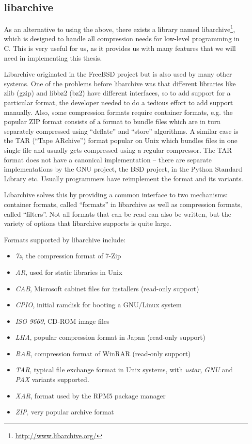 \documentclass[parskip=half]{scrreprt}
\begin{document}
\subsection{libarchive}
\label{sec:libarchive}

As an alternative to using the above, there exists a library named
libarchive\footnote{\url{http://www.libarchive.org/}}, which is designed to
handle all compression needs for low-level programming in C. This is very
useful for us, as it provides us with many features that we will need in
implementing this thesis.

Libarchive originated in the FreeBSD project but is also used by many other
systems. One of the problems before libarchive was that different libraries
like zlib (gzip) and libbz2 (bz2) have different interfaces, so to add support
for a particular format, the developer needed to do a tedious effort to add
support manually. Also, some compression formats require container formats,
e.g. the popular ZIP format consists of a format to bundle files which are in
turn separately compressed using \enquote{deflate} and \enquote{store}
algorithms. A similar case is the TAR (\enquote{Tape ARchive}) format popular
on Unix which bundles files in one single file and usually gets compressed
using a regular compressor. The TAR format does not have a canonical
implementation -- there are separate implementations by the GNU project, the
BSD project, in the Python Standard Library etc. Usually programmers have
reimplement the format and its variants.

Libarchive solves this by providing a common interface to two mechanisms:
container formats, called \enquote{formats} in libarchive as well as
compression formats, called \enquote{filters}. Not all formats that can be read
can also be written, but the variety of options that libarchive supports is
quite large.

Formats supported by libarchive include:

\begin{itemize}
  \item \emph{7z}, the compression format of 7-Zip
  \item \emph{AR}, used for static libraries in Unix
  \item \emph{CAB}, Microsoft cabinet files for installers (read-only support)
  \item \emph{CPIO}, initial ramdisk for booting a GNU/Linux system
  \item \emph{ISO 9660}, CD-ROM image files
  \item \emph{LHA}, popular compression format in Japan (read-only support)
  \item \emph{RAR}, compression format of WinRAR (read-only support)
  \item \emph{TAR}, typical file exchange format in Unix systems, with
    \emph{ustar}, \emph{GNU} and \emph{PAX} variants supported.
  \item \emph{XAR}, format used by the RPM5 package manager
  \item \emph{ZIP}, very popular archive format
\end{itemize}
\end{document}
